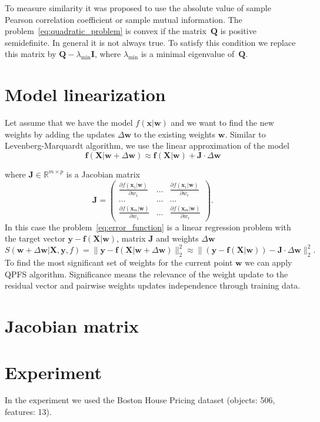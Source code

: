 \documentclass[a4paper,12pt]{article}
\theoremstyle{plain} %
\theoremstyle{definition} %
\theoremstyle{remark} %
\newcommand{\bw}{\mathbf{w}}
\newcommand{\by}{\mathbf{y}}
\newcommand{\bx}{\mathbf{x}}
\newcommand{\bJ}{\mathbf{J}}
\newcommand{\bQ}{\mathbf{Q}}
\newcommand{\bbR}{\mathbb{R}}
\newcommand{\bX}{\mathbf{X}}
\begin{document}
  	To measure similarity it was proposed to use the absolute value of sample Pearson correlation coefficient or sample mutual information.
  	The problem~\ref{eq:quadratic_problem} is convex if the matrix~$\bQ$ is positive semidefinite. In general it is not always true. To satisfy this condition we replace this matrix by $\bQ - \lambda_{\text{min}} \mathbf{I}$, where $\lambda_{\text{min}} $ is a minimal eigenvalue of~$\bQ$.
  	
  	\section*{Model linearization}
  	Let assume that we have the model $f(\bx | \bw)$ and we want to find the new weights by adding the updates $\Delta \bw$ to the existing weights $\bw$. Similar to Levenberg-Marquardt algorithm, we use the linear approximation of the model
  	\[
	  	\mathbf{f}(\bX | \bw + \Delta \bw) \approx \mathbf{f}(\bX | \bw) + \bJ \cdot \Delta  \bw
	\]
	
	where $\mathbf{J} \in \bbR^{m \times p}$ is a Jacobian matrix
	\begin{equation}
		\bJ = 
		\begin{pmatrix}
		\frac{\partial f(\bx_1 | \bw)}{\partial w_1} & \dots & 
		\frac{\partial f(\bx_1 | \bw)}{\partial w_r} \\
		\dots & \dots & \dots \\
		\frac{\partial f(\bx_m | \bw)}{\partial w_1} & \dots & 
		\frac{\partial f(\bx_m | \bw)}{\partial w_r}
		\end{pmatrix}.
	\end{equation}
	In this case the problem~\ref{eq:error_function} is a linear regression problem with the target vector $\by - \mathbf{f}(\bX | \bw)$, matrix $\bJ$ and weights $\Delta \bw$
	\[
		S(\bw + \Delta \bw | \bX, \by, f) =  \| \by - \mathbf{f}(\bX | \bw + \Delta \bw)\|_2^2 \approx  \| (\by - \mathbf{f}(\bX | \bw)) - \bJ \cdot \Delta  \bw\|_2^2.
	\]
  	To find the most significant set of weights for the current point $\bw$ we can apply QPFS algorithm. Significance means the relevance of the weight update to the residual vector and pairwise weights updates independence through training data.
  	
  	\section*{Jacobian matrix }
  	
  	\section*{Experiment}
  	In the experiment we used the Boston House Pricing dataset (objects: 506, features: 13). 
  	
\end{document}
